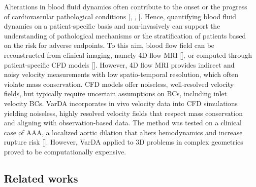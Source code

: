 Alterations in blood fluid dynamics often contribute to the onset or the progress of cardiovascular pathological conditions [\cite{Bappoo2021e013160}, \cite{Guzzardi2015892}, \cite{Pozzi2021}]. Hence, quantifying blood fluid dynamics on a patient-specific basis and non-invasively can support the understanding of pathological mechanisms or the stratification of patients based on the risk for adverse endpoints. To this aim, blood flow field can be reconstructed from clinical imaging, namely 4D flow MRI [\cite{Dyverfeldt2015}], or computed through patient-specific CFD models  [\cite{Salman2021}]. However, 4D flow MRI provides indirect and noisy velocity measurements with low spatio-temporal resolution, which often violate mass conservation. CFD models offer noiseless, well-resolved velocity fields, but typically require uncertain assumptions on BCs, including inlet velocity BCs. VarDA incorporates in vivo velocity data into CFD simulations yielding noiseless, highly resolved velocity fields that respect mass conservation and aligning with observation-based data. The method was tested on a clinical case of AAA, a localized aortic dilation that alters hemodynamics and increase rupture risk [\cite{Lattanzi2020}]. However, VarDA applied to 3D problems in complex geometries proved to be computationally expensive.


\subsection*{Related works}
\label{sec:background}

